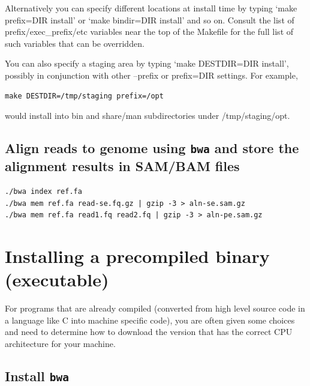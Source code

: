 \documentclass[]{book}
\theoremstyle{definition}
\theoremstyle{definition}
\theoremstyle{definition}
\theoremstyle{remark}
\begin{document}
Alternatively you can specify different locations at install time by
typing `make prefix=DIR install' or `make bindir=DIR install' and so on.
Consult the list of prefix/exec\_prefix/etc variables near the top of
the Makefile for the full list of such variables that can be overridden.

You can also specify a staging area by typing `make DESTDIR=DIR
install', possibly in conjunction with other --prefix or prefix=DIR
settings. For example,

\begin{verbatim}
make DESTDIR=/tmp/staging prefix=/opt
\end{verbatim}

would install into bin and share/man subdirectories under
/tmp/staging/opt.

\subsection{\texorpdfstring{Align reads to genome using \texttt{bwa} and
store the alignment results in SAM/BAM
files}{Align reads to genome using bwa and store the alignment results in SAM/BAM files}}\label{align-reads-to-genome-using-bwa-and-store-the-alignment-results-in-sambam-files}

\begin{verbatim}
./bwa index ref.fa
./bwa mem ref.fa read-se.fq.gz | gzip -3 > aln-se.sam.gz
./bwa mem ref.fa read1.fq read2.fq | gzip -3 > aln-pe.sam.gz
\end{verbatim}

\section{Installing a precompiled binary
(executable)}\label{installing-a-precompiled-binary-executable}

For programs that are already compiled (converted from high level source
code in a language like C into machine specific code), you are often
given some choices and need to determine how to download the version
that has the correct CPU architecture for your machine.

\subsection{\texorpdfstring{Install
\texttt{bwa}}{Install bwa}}\label{install-bwa-1}
\end{document}
